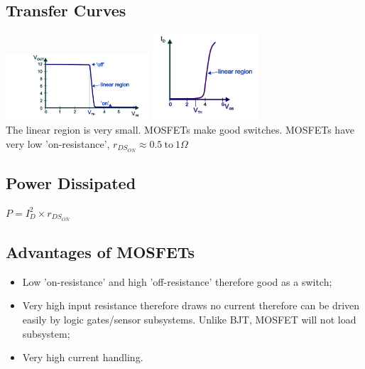 \documentclass[a4paper,11pt, twocolumn]{article}
\begin{document}
\subsection{Transfer Curves}
\includegraphics[width=0.4\textwidth]{mosfet transfer.jpg}
\includegraphics[width=0.3\textwidth]{mosfet iv.jpg}\\
The linear region is very small. MOSFETs make good switches. MOSFETs have very low 'on-resistance', $r_{DS_{ON}}\approx 0.5\ \mathrm{to}\ 1\Omega$
\subsection{Power Dissipated}
$\displaystyle P=I_D^2 \times r_{DS_{ON}}$
\subsection{Advantages of MOSFETs}
\begin{itemize}
    \item Low 'on-resistance' and high 'off-resistance' therefore good as a switch;
    \item Very high input resistance therefore draws no current therefore can be driven easily by logic gates/sensor subsystems. Unlike BJT, MOSFET will not load subsystem;
    \item Very high current handling.
\end{itemize}
\end{document}
